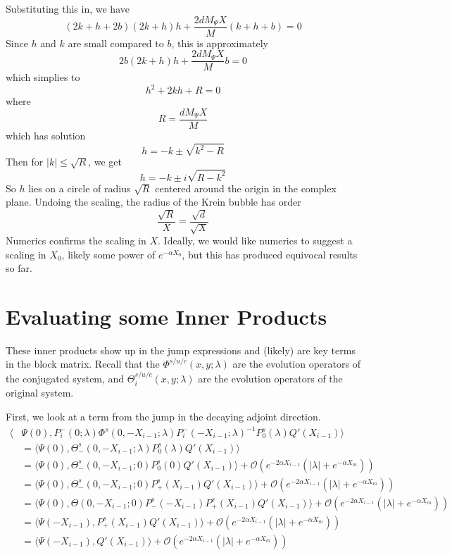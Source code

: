 \documentclass[thesis.tex]{subfiles}
\begin{document}
Substituting this in, we have
\[
(2k + h + 2b)(2k + h) h + \frac{2 d M_\Psi X}{M}(k + h + b) = 0
\]
Since $h$ and $k$ are small compared to $b$, this is approximately
\[
2b (2 k + h) h + \frac{2 d M_\Psi X}{M}b = 0
\]
which simplies to
\[
h^2 + 2kh + R = 0
\]
where
\[
R = \frac{d M_\Psi X}{M}
\]
which has solution
\[
h = -k \pm \sqrt{k^2 - R}
\]
Then for $|k| \leq \sqrt{R}$, we get
\[
h = -k \pm i \sqrt{R - k^2}
\]
So $h$ lies on a circle of radius $\sqrt{R}$ centered around the origin in the complex plane. Undoing the scaling, the radius of the Krein bubble has order
\[
\frac{\sqrt{R}}{X} = \frac{\sqrt{d}}{\sqrt{X}}
\] 
Numerics confirms the scaling in $X$. Ideally, we would like numerics to suggest a scaling in $X_0$, likely some power of $e^{-\alpha X_0}$, but this has produced equivocal results so far.

\section{Evaluating some Inner Products}

These inner products show up in the jump expressions and (likely) are key terms in the block matrix. Recall that the $\Phi^{s/u/c}(x, y; \lambda)$ are the evolution operators of the conjugated system, and $\Theta_i^{s/u/c}(x, y; \lambda)$ are the evolution operators of the original system.

First, we look at a term from the jump in the decaying adjoint direction.
\begin{align*}
\langle &\Psi(0), P_i^-(0; \lambda) \Phi^s(0, -X_{i-1}; \lambda) P_i^-(-X_{i-1}; \lambda)^{-1} P_0^s(\lambda) Q'(X_{i-1})\rangle \\
&= \langle \Psi(0), \Theta_-^s(0, -X_{i-1}; \lambda) P_0^s(\lambda) Q'(X_{i-1})\rangle \\
&= \langle \Psi(0), \Theta_-^s(0, -X_{i-1}; 0) P_0^s(0) Q'(X_{i-1})\rangle + \mathcal{O}(e^{-2\alpha X_{i-1}}(|\lambda| + e^{-\alpha X_m})) \\
&= \langle \Psi(0), \Theta_-^s(0, -X_{i-1}; 0) P^s_+(X_{i-1}) Q'(X_{i-1})\rangle + \mathcal{O}(e^{-2\alpha X_{i-1}}(|\lambda| + e^{-\alpha X_m})) \\
&= \langle \Psi(0), \Theta(0, -X_{i-1}; 0) P^s_-(-X_{i-1}) P^s_+(X_{i-1}) Q'(X_{i-1})\rangle + \mathcal{O}(e^{-2\alpha X_{i-1}}(|\lambda| + e^{-\alpha X_m})) \\
&= \langle \Psi(-X_{i-1}), P^s_+(X_{i-1}) Q'(X_{i-1})\rangle + \mathcal{O}(e^{-2\alpha X_{i-1}}(|\lambda| + e^{-\alpha X_m})) \\
&= \langle \Psi(-X_{i-1}), Q'(X_{i-1})\rangle + \mathcal{O}(e^{-2\alpha X_{i-1}}(|\lambda| + e^{-\alpha X_m})) 
\end{align*}
\end{document}
